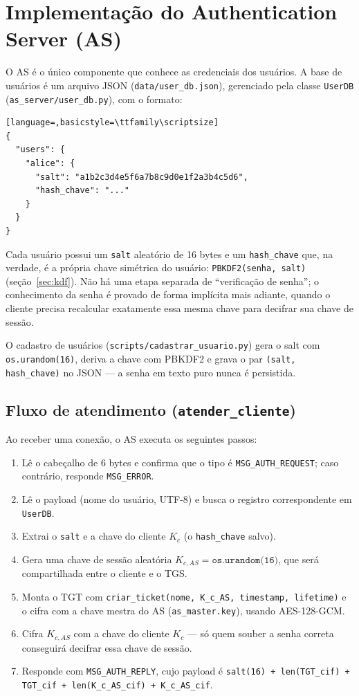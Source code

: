 \documentclass[11pt,a4paper]{article}
\begin{document}
\section{Implementação do Authentication Server (AS)}

O AS é o único componente que conhece as credenciais dos usuários. A base de usuários é
um arquivo JSON (\texttt{data/user\_db.json}), gerenciado pela classe \texttt{UserDB}
(\texttt{as\_server/user\_db.py}), com o formato:

\begin{lstlisting}[language=,basicstyle=\ttfamily\scriptsize]
{
  "users": {
    "alice": {
      "salt": "a1b2c3d4e5f6a7b8c9d0e1f2a3b4c5d6",
      "hash_chave": "..."
    }
  }
}
\end{lstlisting}

Cada usuário possui um \texttt{salt} aleatório de 16 bytes e um \texttt{hash\_chave} que,
na verdade, \'e a própria chave simétrica do usuário: \texttt{PBKDF2(senha, salt)}
(seção~\ref{sec:kdf}). Não há uma etapa separada de ``verificação de senha''; o
conhecimento da senha é provado de forma implícita mais adiante, quando o cliente precisa
recalcular exatamente essa mesma chave para decifrar sua chave de sessão.

O cadastro de usuários (\texttt{scripts/cadastrar\_usuario.py}) gera o salt com
\texttt{os.urandom(16)}, deriva a chave com PBKDF2 e grava o par \texttt{(salt, hash\_chave)}
no JSON --- a senha em texto puro nunca é persistida.

\subsection{Fluxo de atendimento (\texttt{atender\_cliente})}

Ao receber uma conexão, o AS executa os seguintes passos:

\begin{enumerate}
    \item Lê o cabeçalho de 6 bytes e confirma que o tipo é \texttt{MSG\_AUTH\_REQUEST};
    caso contrário, responde \texttt{MSG\_ERROR}.
    \item Lê o payload (nome do usuário, UTF-8) e busca o registro correspondente em
    \texttt{UserDB}.
    \item Extrai o \texttt{salt} e a chave do cliente $K_c$ (o \texttt{hash\_chave} salvo).
    \item Gera uma chave de sessão aleatória $K_{c,AS} = \texttt{os.urandom(16)}$, que será
    compartilhada entre o cliente e o TGS.
    \item Monta o TGT com \texttt{criar\_ticket(nome, K\_c\_AS, timestamp, lifetime)} e o
    cifra com a chave mestra do AS (\texttt{as\_master.key}), usando AES-128-GCM.
    \item Cifra $K_{c,AS}$ com a chave do cliente $K_c$ --- só quem souber a senha correta
    conseguirá decifrar essa chave de sessão.
    \item Responde com \texttt{MSG\_AUTH\_REPLY}, cujo payload é
    \texttt{salt(16) + len(TGT\_cif) + TGT\_cif + len(K\_c\_AS\_cif) + K\_c\_AS\_cif}.
\end{enumerate}
\end{document}
